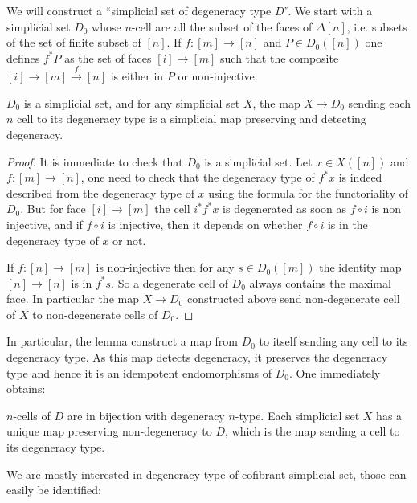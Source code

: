 \documentclass[reqno,10pt,a4paper,oneside,draft]{amsart}
\begin{document}
We will construct a ``simplicial set of degeneracy type $D$''. We start with a simplicial set $D_0$ whose $n$-cell are all the subset of the faces of $\Delta[n]$, i.e. subsets of the set of finite subset of $[n]$. If $f : [m] \rightarrow [n]$ and $P \in D_0([n])$ one defines $f^* P$ as the set of faces  $[i] \rightarrow [m]$ such that the composite $[i] \rightarrow [m] \overset{f}{\rightarrow} [n]$ is either in $P$ or non-injective.

\begin{lemma}
$D_0$ is a simplicial set, and for any simplicial set $X$, the map $X \rightarrow D_0$ sending each $n$ cell to its degeneracy type is a simplicial map preserving and detecting degeneracy.
\end{lemma}

\begin{proof}
It is immediate to check that $D_0$ is a simplicial set. Let $x \in X([n])$ and $f:[m] \rightarrow [n]$, one need to check that the degeneracy type of $f^* x$ is indeed described from the degeneracy type of $x$ using the formula for the functoriality of $D_0$. But for face $[i] \rightarrow [m]$ the cell $i^* f^* x$ is degenerated as soon as $f \circ i$ is non injective, and if $f\circ i$ is injective, then it depends on whether $f \circ i$ is in the degeneracy type of $x$ or not.

If $f:[n] \rightarrow [m]$ is non-injective then for any $s \in D_0([m])$ the identity map $[n] \rightarrow [n]$ is in $f^* s$. So a degenerate cell of $D_0$ always contains the maximal face. In particular the map $X \rightarrow D_0$ constructed above send non-degenerate cell of $X$ to non-degenerate cells of $D_0$.

\end{proof}

In particular, the lemma construct a map from $D_0$ to itself sending any cell to its degeneracy type. As this map detects degeneracy, it preserves the degeneracy type and hence it is an idempotent endomorphisms of $D_0$. One immediately obtains:

\begin{lemma}
$n$-cells of $D$ are in bijection with degeneracy $n$-type. Each simplicial set $X$ has a unique map preserving non-degeneracy to $D$, which is the map sending a cell to its degeneracy type.
\end{lemma}




We are mostly interested in degeneracy type of cofibrant simplicial set, those can easily be identified:
\end{document}
